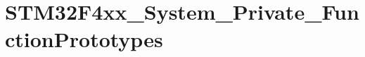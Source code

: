 \hypertarget{group__STM32F4xx__System__Private__FunctionPrototypes}{}\section{S\+T\+M32\+F4xx\+\_\+\+System\+\_\+\+Private\+\_\+\+Function\+Prototypes}
\label{group__STM32F4xx__System__Private__FunctionPrototypes}
